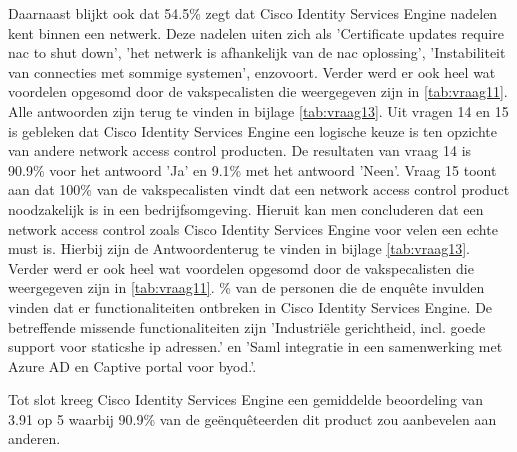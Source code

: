 Daarnaast blijkt ook dat 54.5\% zegt dat Cisco Identity Services Engine nadelen kent binnen een netwerk. Deze nadelen uiten zich als 'Certificate updates require nac to shut down', 'het netwerk is afhankelijk van de nac oplossing', 'Instabiliteit van connecties met sommige systemen', enzovoort. Verder werd er ook heel wat voordelen opgesomd door de vakspecalisten die weergegeven zijn in \ref{tab:vraag11}. Alle antwoorden zijn terug te vinden in bijlage \ref{tab:vraag13}.
\newline
\newline
Uit vragen 14 en 15 is gebleken dat Cisco Identity Services Engine een logische keuze is ten opzichte van andere network access control producten. De resultaten van vraag 14 is 90.9\% voor het antwoord 'Ja' en 9.1\% met het antwoord 'Neen'. Vraag 15 toont aan dat 100\% van de vakspecalisten vindt dat een network access control product noodzakelijk is in een bedrijfsomgeving. Hieruit kan men concluderen dat een network access control zoals Cisco Identity Services Engine voor velen een echte must is.
Hierbij zijn de Antwoordenterug te vinden in bijlage \ref{tab:vraag13}. Verder werd er ook heel wat voordelen opgesomd door de vakspecalisten die weergegeven zijn in \ref{tab:vraag11}.
\newline
{}\% van de personen die de enquête invulden vinden dat er functionaliteiten ontbreken in Cisco Identity Services Engine. De betreffende missende functionaliteiten zijn 'Industriële gerichtheid, incl. goede support voor staticshe ip adressen.' en 'Saml integratie in een samenwerking met Azure AD en Captive portal voor byod.’.


Tot slot kreeg Cisco Identity Services Engine een gemiddelde beoordeling van 3.91 op 5 waarbij 90.9\% van de geënquêteerden dit product zou aanbevelen aan anderen.



